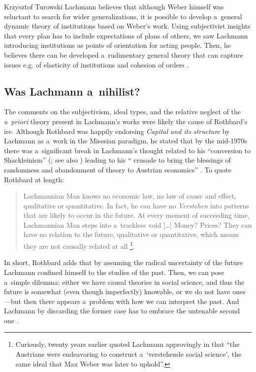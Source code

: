 \begin{artengenv}{Krzysztof Turowski}
Lachmann believes that although Weber himself was reluctant to search for wider generalizations, it is possible to develop a~general dynamic theory of institutions based on Weber's work.
Using subjectivist insights that every plan has to include expectations of plans of others, we saw Lachmann introducing institutions as points of orientation for acting people. Then, he believes there can be developed a~rudimentary general theory that can capture issues e.g. of elasticity of institutions and cohesion of orders \parencite[8]{lachmann-weber}.

\subsection{Was Lachmann a~nihilist?}


The comments on the subjectivism, ideal types, and the relative neglect of the \emph{a~priori} theory present in Lachmann's works were likely the cause of Rothbard's ire.
Although Rothbard was happily endorsing \emph{Capital and its structure} by Lachmann as a~work in the Misesian paradigm, he stated that by the mid-1970s there was a~significant break in Lachmann's thought related to his ``conversion to Shackleinism'' (\cite[53]{rothbard-present}; see also \cite{barbieri2021lachmann}) leading to his `` crusade to bring the blessings of randomness and abandonment of theory to Austrian economics'' \parencite[56--57]{rothbard-hermeneutic}. To quote Rothbard at length:
\begin{quote}
Lachmannian Man knows no economic law, no law of cause and effect, qualitative or quantitative. In fact, he can have no \emph{Verstehen} into patterns that are likely to occur in the future. At every moment of succeeding time, Lachmannian Man steps into a~trackless void [\ldots] Money? Prices? They can have no relation to the future, qualitative or quantitative, which means they are not causally related at all \parencite[52]{rothbard-present}\footnote{Curiously, twenty years earlier \textcite[50]{rothbard-praxeology-method} quoted Lachmann approvingly in that ``the Austrians were endeavoring to construct a~`verstehende social science', the same ideal that Max Weber was later to uphold''.}.
\end{quote}
In short, Rothbard adds that by assuming the radical uncertainty of the future Lachmann confined himself to the studies of the past.
Then, we can pose a~simple dilemma: either we have causal theories in social science, and thus the future is somewhat (even though imperfectly) knowable, or we do not have ones---but then there appears a~problem with how we can interpret the past. And Lachmann by discarding the former case has to embrace the untenable second one \parencite[53--54]{rothbard-present}.


\end{artengenv}

